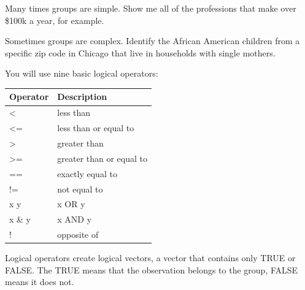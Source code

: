 \documentclass[]{book}
\theoremstyle{definition}
\theoremstyle{definition}
\theoremstyle{definition}
\theoremstyle{remark}
\begin{document}
Many times groups are simple. Show me all of the professions that make
over \$100k a year, for example.

Sometimes groups are complex. Identify the African American children
from a specific zip code in Chicago that live in households with single
mothers.

You will use nine basic logical operators:

\begin{longtable}[]{@{}ll@{}}
\toprule
Operator & Description\tabularnewline
\midrule
\endhead
\textless{} & less than\tabularnewline
\textless{}= & less than or equal to\tabularnewline
\textgreater{} & greater than\tabularnewline
\textgreater{}= & greater than or equal to\tabularnewline
== & exactly equal to\tabularnewline
!= & not equal to\tabularnewline
x \textbar{} y & x OR y\tabularnewline
x \& y & x AND y\tabularnewline
! & opposite of\tabularnewline
\bottomrule
\end{longtable}

Logical operators create logical vectors, a vector that contains only
TRUE or FALSE. The TRUE means that the observation belongs to the group,
FALSE means it does not.
\end{document}
